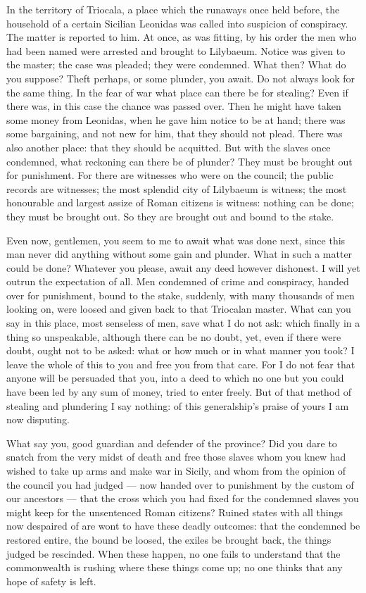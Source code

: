  In the territory of Triocala, a place which the runaways once held before, the household of a certain Sicilian Leonidas was called into suspicion of conspiracy. The matter is reported to him. At once, as was fitting, by his order the men who had been named were arrested and brought to Lilybaeum. Notice was given to the master; the case was pleaded; they were condemned. What then? What do you suppose? Theft perhaps, or some plunder, you await. Do not always look for the same thing. In the fear of war what place can there be for stealing? Even if there was, in this case the chance was passed over. Then he might have taken some money from Leonidas, when he gave him notice to be at hand; there was some bargaining, and not new for him, that they should not plead. There was also another place: that they should be acquitted. But with the slaves once condemned, what reckoning can there be of plunder? They must be brought out for punishment. For there are witnesses who were on the council; the public records are witnesses; the most splendid city of Lilybaeum is witness; the most honourable and largest assize of Roman citizens is witness: nothing can be done; they must be brought out. So they are brought out and bound to the stake.

 Even now, gentlemen, you seem to me to await what was done next, since this man never did anything without some gain and plunder. What in such a matter could be done? Whatever you please, await any deed however dishonest. I will yet outrun the expectation of all. Men condemned of crime and conspiracy, handed over for punishment, bound to the stake, suddenly, with many thousands of men looking on, were loosed and given back to that Triocalan master. What can you say in this place, most senseless of men, save what I do not ask: which finally in a thing so unspeakable, although there can be no doubt, yet, even if there were doubt, ought not to be asked: what or how much or in what manner you took? I leave the whole of this to you and free you from that care. For I do not fear that anyone will be persuaded that you, into a deed to which no one but you could have been led by any sum of money, tried to enter freely. But of that method of stealing and plundering I say nothing: of this generalship's praise of yours I am now disputing.

 What say you, good guardian and defender of the province? Did you dare to snatch from the very midst of death and free those slaves whom you knew had wished to take up arms and make war in Sicily, and whom from the opinion of the council you had judged --- now handed over to punishment by the custom of our ancestors --- that the cross which you had fixed for the condemned slaves you might keep for the unsentenced Roman citizens? Ruined states with all things now despaired of are wont to have these deadly outcomes: that the condemned be restored entire, the bound be loosed, the exiles be brought back, the things judged be rescinded. When these happen, no one fails to understand that the commonwealth is rushing where these things come up; no one thinks that any hope of safety is left.

